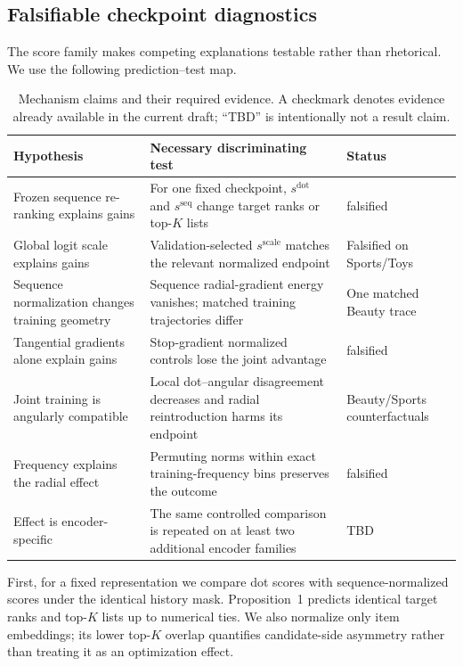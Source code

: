\documentclass[sigconf,anonymous,review]{acmart}
\begin{document}
\subsection{Falsifiable checkpoint diagnostics}
The score family makes competing explanations testable rather than rhetorical. We use the following prediction--test map.
\begin{table}[t]
\caption{Mechanism claims and their required evidence. A checkmark denotes evidence already available in the current draft; ``TBD'' is intentionally not a result claim.}\label{tab:evidence-map}
\centering\scriptsize
\begin{tabular}{p{}p{}p{}}\toprule
Hypothesis&Necessary discriminating test&Status\\\midrule
Frozen sequence re-ranking explains gains&For one fixed checkpoint, $s^{\mathrm{dot}}$ and $s^{\mathrm{seq}}$ change target ranks or top-$K$ lists&\textsf{falsified}\\
Global logit scale explains gains&Validation-selected $s^{\mathrm{scale}}$ matches the relevant normalized endpoint&Falsified on Sports/Toys\\
Sequence normalization changes training geometry&Sequence radial-gradient energy vanishes; matched training trajectories differ&One matched Beauty trace\\
Tangential gradients alone explain gains&Stop-gradient normalized controls lose the joint advantage&\textsf{falsified}\\
Joint training is angularly compatible&Local dot--angular disagreement decreases and radial reintroduction harms its endpoint&Beauty/Sports counterfactuals\\
Frequency explains the radial effect&Permuting norms within exact training-frequency bins preserves the outcome&\textsf{falsified}\\
Effect is encoder-specific&The same controlled comparison is repeated on at least two additional encoder families&TBD\\\bottomrule
\end{tabular}
\end{table}

First, for a fixed representation we compare dot scores with sequence-normalized scores under the identical history mask. Proposition~1 predicts identical target ranks and top-$K$ lists up to numerical ties. We also normalize only item embeddings; its lower top-$K$ overlap quantifies candidate-side asymmetry rather than treating it as an optimization effect.
\end{document}
